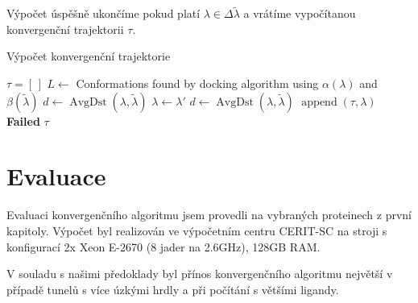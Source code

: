 Výpočet úspěšně ukončíme pokud platí $\lambda \in \Delta\tilde{\lambda}$ a
vrátíme vypočítanou konvergenční trajektorii $ \tau $.

\begin{algorithm}
\caption{Výpočet konvergenční trajektorie}
\label{alg:convergence}
\begin{algorithmic}[1]

    \State $ \tau = [\,] $
    \While {$\lambda \not\in \Delta\tilde{\lambda}$}
        \State $ L \gets $ Conformations found by docking algorithm using $ \alpha(\lambda) $
            and $ \beta(\tilde{\lambda})$ \label{alg:convergence:docking}
        \State $ d \gets \operatorname{AvgDst}(\lambda, \tilde{\lambda}) $
             \label{alg:convergence:feasibility}
                 \label{alg:convergence:best}
                    \State $ \lambda \gets \lambda' $
                \EndIf
            \EndIf
        \EndFor
         \label{alg:convergence:progress}
            \State $d \gets \operatorname{AvgDst}(\lambda, \tilde{\lambda}) $
            \State $ \operatorname{append}(\tau, \lambda) $
        \Else
            \State \Return \textbf{Failed}
        \EndIf
    \EndWhile
    \State \Return $\tau$
\EndFunction


\end{algorithmic}
\end{algorithm}





\section{Evaluace} \label{subsec:convergence_evaluation}
Evaluaci konvergenčního algoritmu jsem provedli na vybraných proteinech
z první kapitoly. Výpočet byl realizován ve výpočetním centru CERIT-SC na
stroji s konfigurací 2x Xeon E-2670 (8 jader na 2.6GHz), 128GB RAM.

V souladu s našimi předoklady byl přínos konvergenčního algoritmu největší
v případě tunelů s více úzkými hrdly a při počítání s většími ligandy.


